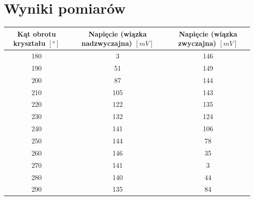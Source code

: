 \documentclass[quantumrep,article,accept,oneauthor,pdftex]{Definitions/mdpi}
\begin{document}
\section{Wyniki pomiarów}

\begin{table}[H]
\centering
\begin{tabular}{ccc}
\toprule
\textbf{Kąt obrotu kryształu \( [^o] \)} & \textbf{Napięcie (wiązka nadzwyczajna) \( [mV] \)} & \textbf{Napięcie (wiązka zwyczajna) \( [mV] \)} \\
\midrule
180                                   & 3                                                & 146                                           \\
190                                   & 51                                               & 149                                           \\
200                                   & 87                                               & 144                                           \\
210                                   & 105                                              & 143                                           \\
220                                   & 122                                              & 135                                           \\
230                                   & 132                                              & 124                                           \\
240                                   & 141                                              & 106                                           \\
250                                   & 144                                              & 78                                            \\
260                                   & 146                                              & 35                                            \\
270                                   & 141                                              & 3                                             \\
280                                   & 140                                              & 44                                            \\
290                                   & 135                                              & 84                                            \\

\end{tabular}
\end{table}
\end{document}
